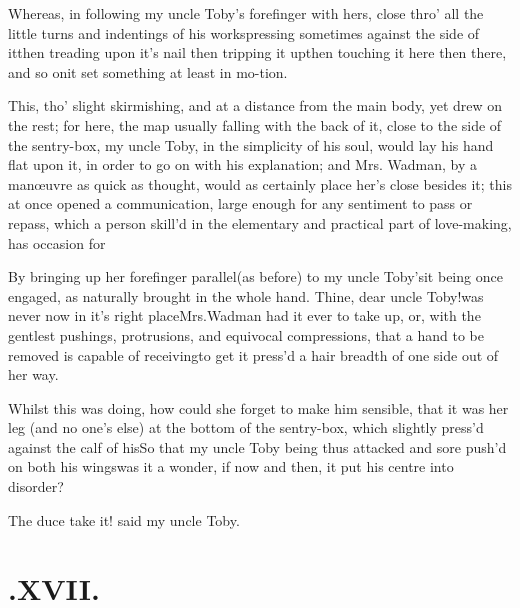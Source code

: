\documentclass{article}
\begin{document}
Whereas, in following my uncle Toby’s forefinger
with hers, close thro’ all the little turns and indentings of
his works\tsh pressing sometimes against the side of
it\tsh then treading upon it's nail \tsh then
tripping it up\tsh then touching it here \tsh then
there, and so on\tsh it set something at least in
mo-\break tion.

This, tho’ slight skirmishing, and at a distance from the
main body, yet drew on the rest; for here, the map usually falling
with the back of it, close to the side of the sentry-box, my uncle
Toby, in the simplicity of his soul, would lay his hand flat
upon it, in order to go on with his explanation; and Mrs.\@
Wadman, by a manœuvre as quick as thought, would as
certainly place her’s close besides it; this at once opened a
communication, large enough for any sentiment to pass or repass,
which a person skill’d in the elementary and practical part of love-making, has
occasion for\tsh

By bringing up her forefinger parallel\break (as before) to my uncle Toby’s\tsk it
being once engaged, as naturally brought in the whole hand. Thine, dear uncle
Toby!\@ was never now in it’s right place\break\tsh Mrs.\@ Wadman had it ever to
take up, or, with the gentlest pushings, protrusions, and equivocal compressions,
that a hand to be removed is capable of receiving\tsh to get it press’d a hair
breadth of one side out of her way.

Whilst this was doing, how could she forget to make him
sensible, that it was her leg (and no one’s else) at the
bottom of the sentry-box, which slightly press’d against the
calf of his\tsh So that my uncle Toby being thus
attacked and sore push’d on both his
wings\tsh was it a wonder, if now and then, it put his\break
centre into disorder?\tsh

\tsh The duce take it! said my uncle Toby.

\vfill{}\eject\null\smallskip
\section{.\enspace XVII.}
\end{document}
